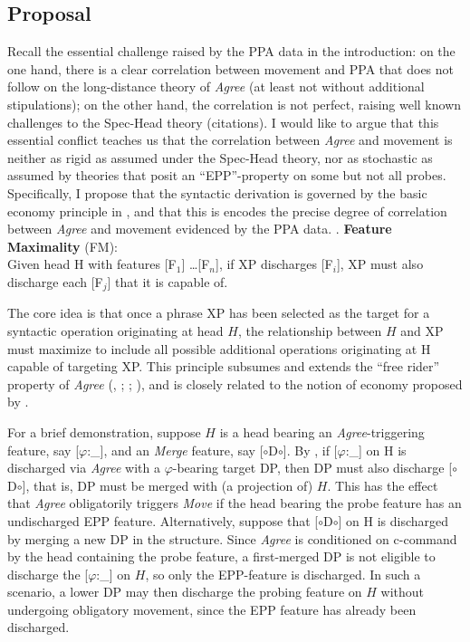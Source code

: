 \documentclass[11pt, letterpaper]{paper_nick}
\newcommand{\fm}[1]{[$\circ$#1$\circ$]}
\begin{document}
\subsection{Proposal}

Recall the essential challenge raised by the PPA data in the introduction: on the one hand, there is a clear correlation between movement and PPA that does not follow on the long-distance theory of \emph{Agree} (at least not without additional stipulations); on the other hand, the correlation is not perfect, raising well known challenges to the Spec-Head theory (citations). I would like to argue that this essential conflict teaches us that the correlation between \emph{Agree} and movement is neither as rigid as assumed under the Spec-Head theory, nor as stochastic as assumed by theories that posit an ``EPP''-property on some but not all probes. Specifically, I propose that the syntactic derivation is governed by the basic economy principle in \Next, and that this is encodes the precise degree of correlation between \emph{Agree} and movement evidenced by the PPA data.
\ex.\label{fm} \textbf{Feature Maximality} (FM):\\
Given head H with features [F$_1$] \ldots [F$_n$], if XP discharges [F$_i$], XP must also discharge each [F$_j$] that it is capable of.

The core idea is that once a phrase XP has been selected as the target for a syntactic operation originating at head $H$, the relationship between $H$ and XP must maximize to include all possible additional operations originating at H capable of targeting XP. This principle subsumes and extends the ``free rider'' property of \emph{Agree} (\citealt{chomsky95}, \citeyear{chomsky01}; \citealt{bruening01}; \citealt{rezac13}), and is closely related to the notion of economy proposed by \citet{pesetsky01}.

For a brief demonstration, suppose $H$ is a head bearing an \emph{Agree}-triggering feature, say [$\varphi$:\_], and an \emph{Merge} feature, say \fm{D}. By \Last, if [$\varphi$:\_] on H is discharged via \emph{Agree} with a $\varphi$-bearing target DP, then DP must also discharge \fm{D}, that is, DP must be merged with (a projection of) $H$. This has the effect that \emph{Agree} obligatorily triggers \emph{Move} if the head bearing the probe feature has an undischarged EPP feature. Alternatively, suppose that \fm{D} on H is discharged by merging a new DP in the structure. Since \emph{Agree} is conditioned on c-command by the head containing the probe feature, a first-merged DP is not eligible to discharge the [$\varphi$:\_] on $H$, so only the EPP-feature is discharged. In such a scenario, a lower DP may then discharge the probing feature on $H$ without undergoing obligatory movement, since the EPP feature has already been discharged. 
\end{document}
